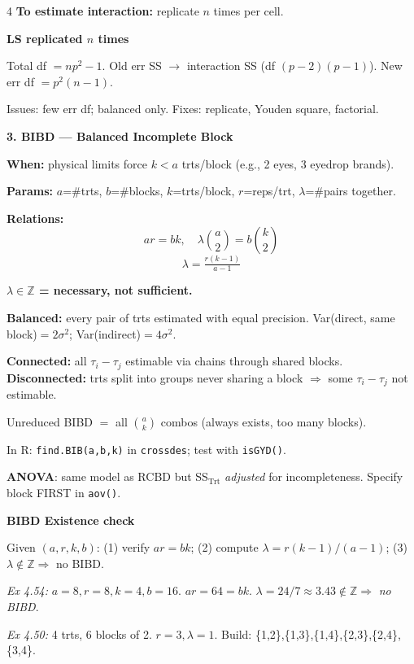 \documentclass[7pt,letterpaper,landscape]{extarticle}
\newcommand{\secbar}[1]{%
  \vspace{2pt}%
  {\colorbox{black!80}{\parbox{\dimexpr\linewidth-2\fboxsep}{\color{white}\small\bfseries #1}}}\par%
  \vspace{1pt}%
}
\newcommand{\subsec}[1]{\vspace{1pt}\textbf{\small #1}\par}
\begin{document}
\begin{multicols*}{4}
\textbf{To estimate interaction:} replicate $n$ times per cell.

\subsec{LS replicated $n$ times}
Total df $=np^2{-}1$. Old err SS $\to$ interaction SS (df $(p{-}2)(p{-}1)$). New err df $=p^2(n{-}1)$.

Issues: few err df; balanced only. Fixes: replicate, Youden square, factorial.

\secbar{3. BIBD — Balanced Incomplete Block}
\textbf{When:} physical limits force $k{<}a$ trts/block (e.g., 2 eyes, 3 eyedrop brands).

\textbf{Params:} $a$=\#trts, $b$=\#blocks, $k$=trts/block, $r$=reps/trt, $\lambda$=\#pairs together.

\textbf{Relations:}
\[a r{=}b k,\quad \lambda\binom{a}{2}{=}b\binom{k}{2}\]
\[\boxed{\lambda{=}\tfrac{r(k{-}1)}{a{-}1}}\]

\textbf{$\lambda\in\mathbb Z$ = necessary, not sufficient.}

\textbf{Balanced:} every pair of trts estimated with equal precision. Var(direct, same block)$=2\sigma^2$; Var(indirect)$=4\sigma^2$.

\textbf{Connected:} all $\tau_i{-}\tau_j$ estimable via chains through shared blocks.\\
\textbf{Disconnected:} trts split into groups never sharing a block $\Rightarrow$ some $\tau_i{-}\tau_j$ not estimable.

Unreduced BIBD $=$ all $\binom{a}{k}$ combos (always exists, too many blocks).

In R: \texttt{find.BIB(a,b,k)} in \texttt{crossdes}; test with \texttt{isGYD()}.

\textbf{ANOVA}: same model as RCBD but SS$_{\text{Trt}}$ \emph{adjusted} for incompleteness. Specify block FIRST in \texttt{aov()}.

\subsec{BIBD Existence check}
Given $(a,r,k,b)$: (1) verify $ar{=}bk$; (2) compute $\lambda{=}r(k{-}1)/(a{-}1)$; (3) $\lambda{\notin}\mathbb Z\Rightarrow$ no BIBD.

\textit{Ex 4.54:} $a{=}8,r{=}8,k{=}4,b{=}16$. $ar{=}64{=}bk$\checkmark. $\lambda{=}24/7{\approx}3.43{\notin}\mathbb Z\Rightarrow$ \emph{no BIBD}.

\textit{Ex 4.50:} 4 trts, 6 blocks of 2. $r{=}3,\lambda{=}1$. Build: \{1,2\},\{1,3\},\{1,4\},\{2,3\},\{2,4\},\{3,4\}.


\end{multicols*}
\end{document}
